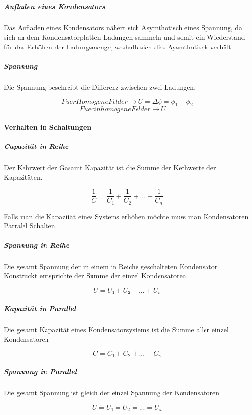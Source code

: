 \documentclass{article}
\begin{document}
    				\subparagraph{Aufladen eines Kondensators}
    				
    					Das Aufladen eines Kondensators nähert sich Asymthotisch eines Spannung, da sich an dem Kondensatorplatten Ladungen sammeln und somit ein Wiederstand für das Erhöhen der Ladungsmenge, weshalb sich dies Aysmthotisch verhält. 
    					
    				\subparagraph{Spannung}
    				
    					Die Spannung beschreibt die Differenz zwischen zwei Ladungen. 
    					
    					\[Fuer Homogene Felder \longrightarrow U = \Delta \phi = \phi_{1} - \phi_{2}\] 
    					\[Fuer inhomogene Felder \longrightarrow U = \]
    					
       			
       			\paragraph{Verhalten in Schaltungen}
       			
       			
       				\subparagraph{Capazität in Reihe}
       					
       					Der Kehrwert der Gasamt Kapazität ist die Summe der Kerhwerte der Kapazitäten. 
       					
       					\[ \frac{1}{C} = \frac{1}{C_{1}} + \frac{1}{C_{2}} + ... + \frac{1}{C_{n}}\]
       					
       					Falls man die  Kapazität eines Systems erhöhen möchte muss man Kondensatoren Parralel Schalten. 
       					
       				\subparagraph{Spannung in Reihe}
       					
       					Die gesamt Spannung der in einem in Reiche geschalteten Kondensator Konstruckt entsprichte der Summe der einzel Kondensatoren. 
       					
       					\[U = U_{1} + U_{2} + ... + U_{n}\]
       					
       				\subparagraph{Kapazität in Parallel}
       				
       					Die gesamt Kapazität eines Kondensatorsystems ist die Summe aller einzel Kondensatoren
       					
       					\[C = C_{1} + C_{2} + ... + C_{n}\]
       					
       				\subparagraph{Spannung  in Parallel}
       				
       					Die gesamt Spannung ist gleich der einzel Spannung der Kondensatoren
       					
       					\[U = U_{1} = U_{2} = ... = U_{n}\]
        
\end{document}
